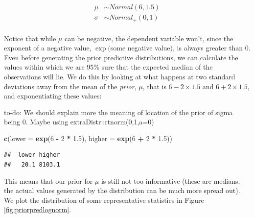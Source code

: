 \documentclass[12pt,]{krantz}
\makeatletter
\newenvironment{Shaded}{\begin{snugshade}}{\end{snugshade}}
\newcommand{\KeywordTok}[1]{\textcolor[rgb]{0.13,0.29,0.53}{\textbf{#1}}}
\newcommand{\DataTypeTok}[1]{\textcolor[rgb]{0.13,0.29,0.53}{#1}}
\newcommand{\DecValTok}[1]{\textcolor[rgb]{0.00,0.00,0.81}{#1}}
\newcommand{\FloatTok}[1]{\textcolor[rgb]{0.00,0.00,0.81}{#1}}
\newcommand{\StringTok}[1]{\textcolor[rgb]{0.31,0.60,0.02}{#1}}
\newcommand{\OperatorTok}[1]{\textcolor[rgb]{0.81,0.36,0.00}{\textbf{#1}}}
\newcommand{\NormalTok}[1]{#1}
\newenvironment{kframe}{%
\medskip{}
\setlength{\fboxsep}{.8em}
 \def\at@end@of@kframe{}%
 \ifinner\ifhmode%
  \def\at@end@of@kframe{\end{minipage}}%
  \begin{minipage}{\columnwidth}%
 \fi\fi%
 \def\FrameCommand##1{\hskip\@totalleftmargin \hskip-\fboxsep
 \colorbox{shadecolor}{##1}\hskip-\fboxsep
     \hskip-\linewidth \hskip-\@totalleftmargin \hskip\columnwidth}%
 \MakeFramed {\advance\hsize-\width
   \@totalleftmargin\z@ \linewidth\hsize
   \@setminipage}}%
 {\par\unskip\endMakeFramed%
 \at@end@of@kframe}
\newenvironment{rmdblock}[1]
  {
  \begin{itemize}
  \renewcommand{\labelitemi}{
    \raisebox{-.7\height}[0pt][0pt]{
      {\setkeys{Gin}{width=3em,keepaspectratio}\texttt{[image: images/\#1]}}
    }
  }
  \setlength{\fboxsep}{1em}
  \begin{kframe}
  \item
  }
  {
  \end{kframe}
  \end{itemize}
  }
\newenvironment{rmdnote}
  {\begin{rmdblock}{note}}
  {\end{rmdblock}}
\theoremstyle{definition}
\theoremstyle{definition}
\theoremstyle{definition}
\theoremstyle{remark}
\makeatother
\begin{document}
\begin{equation}
\begin{aligned}
\mu &\sim Normal(6, 1.5) \\
\sigma &\sim Normal_+(0, 1) \\
\end{aligned}
\label{eq:logpriorsnorm}
\end{equation}

Notice that while \(\mu\) can be negative, the dependent variable won't,
since the exponent of a negative value, \(\exp(\)some negative
value\()\), is always greater than \(0\). Even before generating the
prior predictive distributions, we can calculate the values within which
we are 95\% sure that the expected median of the observations will lie.
We do this by looking at what happens at two standard deviations away
from the mean of the \emph{prior}, \(\mu\), that is \(6 - 2\times 1.5\)
and \(6 + 2\times 1.5\), and exponentiating these values:

\begin{rmdnote} to-do: We should explain more the meaning of
location of the prior of sigma being 0. Maybe using
extraDistr::rtnorm(0,1,a=0) \end{rmdnote}

\begin{Shaded}
\begin{Highlighting}[]
\KeywordTok{c}\NormalTok{(}\DataTypeTok{lower =} \KeywordTok{exp}\NormalTok{(}\DecValTok{6} \OperatorTok{-}\StringTok{ }\DecValTok{2} \OperatorTok{*}\StringTok{ }\FloatTok{1.5}\NormalTok{),}
  \DataTypeTok{higher =} \KeywordTok{exp}\NormalTok{(}\DecValTok{6} \OperatorTok{+}\StringTok{ }\DecValTok{2} \OperatorTok{*}\StringTok{ }\FloatTok{1.5}\NormalTok{))}
\end{Highlighting}
\end{Shaded}

\begin{verbatim}
##  lower higher 
##   20.1 8103.1
\end{verbatim}

This means that our prior for \(\mu\) is still not too informative
(these are medians; the actual values generated by the distribution can
be much more spread out). We plot the distribution of some
representative statistics in Figure \ref{fig:priorpredlognorm}.
\end{document}
